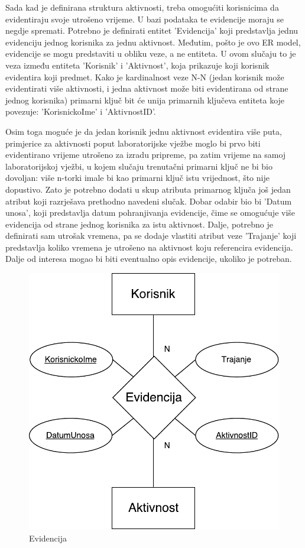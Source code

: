 \documentclass[times, utf8, zavrsni]{fer}
\begin{document}
Sada kad je definirana struktura aktivnosti, treba omogućiti korisnicima da evidentiraju svoje utrošeno vrijeme. U bazi podataka te evidencije moraju se negdje spremati. Potrebno je definirati entitet 'Evidencija' koji predstavlja jednu evidenciju jednog korisnika za jednu aktivnost. Međutim, pošto je ovo ER model, evidencije se mogu predstaviti u obliku veze, a ne entiteta. U ovom slučaju to je veza između entiteta 'Korisnik' i 'Aktivnost', koja prikazuje koji korisnik evidentira koji predmet. Kako je kardinalnost veze N-N (jedan korisnik može evidentirati više aktivnosti, i jedna aktivnost može biti evidentirana od strane jednog korisnika) primarni ključ bit će unija primarnih ključeva entiteta koje povezuje: 'KorisnickoIme' i 'AktivnostID'.

Osim toga moguće je da jedan korisnik jednu aktivnost evidentira više puta, primjerice za aktivnosti poput laboratorijske vježbe moglo bi prvo biti evidentirano vrijeme utrošeno za izradu pripreme, pa zatim vrijeme na samoj laboratorijskoj vježbi, u kojem slučaju trenutačni primarni ključ ne bi bio dovoljan: više n-torki imale bi kao primarni ključ istu vrijednost, što nije dopustivo. Zato je potrebno dodati u skup atributa primarnog ključa još jedan atribut koji razrješava prethodno navedeni slučak. Dobar odabir bio bi 'Datum unosa', koji predstavlja datum pohranjivanja evidencije, čime se omogućuje više evidencija od strane jednog korisnika za istu aktivnost. Dalje, potrebno je definirati sam utrošak vremena, pa se dodaje vlastiti atribut veze 'Trajanje' koji predstavlja koliko vremena je utrošeno na aktivnost koju referencira evidencija. Dalje od interesa mogao bi biti eventualno opis evidencije, ukoliko je potreban. 

\begin{figure}[H]
\centering
\includegraphics[scale=0.7]{img/evidencija.pdf}
\caption{Evidencija}
\label{fig:evidencija}
\end{figure}
\end{document}
